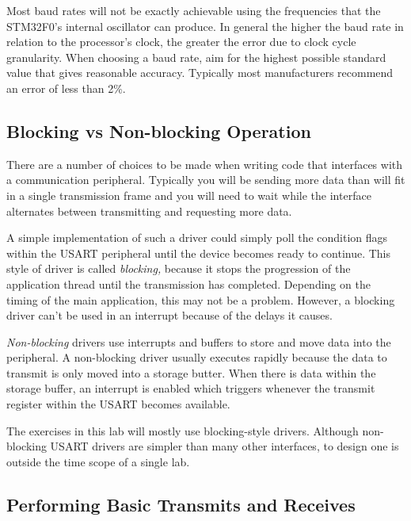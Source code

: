 \documentclass[11pt,fleqn]{book} %
\begin{document}
Most baud rates will not be exactly achievable using the frequencies that the STM32F0's internal oscillator can produce. In general the higher the baud rate in relation to the processor's clock, the greater the error due to clock cycle granularity. When choosing a baud rate, aim for the highest possible standard value that gives reasonable accuracy. Typically most manufacturers recommend an error of less than 2\%. 


\subsection{Blocking vs Non-blocking Operation}

There are a number of choices to be made when writing code that interfaces with a communication peripheral. Typically you will be sending more data than will fit in a single transmission frame and you will need to wait while the interface alternates between transmitting and requesting more data.

A simple implementation of such a driver could simply poll the condition flags within the USART peripheral until the device becomes ready to continue. This style of driver is called \textit{blocking,} because it stops the progression of the application thread until the transmission has completed. Depending on the timing of the main application, this may not be a problem. However, a blocking driver can't be used in an interrupt because of the delays it causes. 

\textit{Non-blocking} drivers use interrupts and buffers to store and move data into the peripheral. A non-blocking driver usually executes rapidly because the data to transmit is only moved into a storage butter. When there is data within the storage buffer, an interrupt is enabled which triggers whenever the transmit register within the USART becomes available. 

The exercises in this lab will mostly use blocking-style drivers. Although non-blocking USART drivers are simpler than many other interfaces, to design one is outside the time scope of a single lab. 
%
\subsection{Performing Basic Transmits and Receives}
\end{document}
